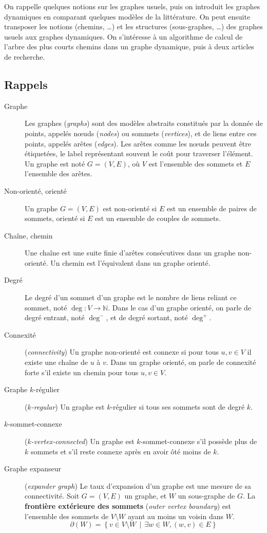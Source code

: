 \documentclass[12pt,a4paper]{article}
\begin{document}
On rappelle quelques notions sur les graphes usuels, puis on introduit
les graphes dynamiques en comparant quelques modèles de la
littérature. On peut ensuite transposer les notions (chemins, …) et
les structures (sous-graphes, …) des graphes usuels aux graphes
dynamiques. On s'intéresse à un algorithme de calcul de l'arbre des
plus courts chemins dans un graphe dynamique, puis à deux articles de
recherche.

\subsection{Rappels}

\begin{description}
\item[Graphe] Les graphes (\textit{graphs}) sont des modèles abstraits
  constitués par la donnée de points, appelés nœuds (\textit{nodes})
  ou sommets (\textit{vertices}), et de liens entre ces points,
  appelés arêtes (\textit{edges}). Les arêtes comme les nœuds peuvent
  être étiquetées, le label représentant souvent le coût pour
  traverser l'élément. Un graphe est noté \(G = (V, E)\), où \(V\)
  est l'ensemble des sommets et \(E\) l'ensemble des arêtes.
\item[Non-orienté, orienté] Un graphe \(G = (V, E)\) est non-orienté si
  \(E\) est un ensemble de paires de sommets, orienté si \(E\) est un
  ensemble de couples de sommets.
\item[Chaîne, chemin] Une chaîne est une suite finie d'arêtes
  consécutives dans un graphe non-orienté. Un chemin est l'équivalent
  dans un graphe orienté.
\item[Degré] Le degré d'un sommet d'un graphe est le nombre de liens
  reliant ce sommet, noté \(\deg : V \to \mathbb{N}\). Dans le cas
  d'un graphe orienté, on parle de degré entrant, noté \(\deg^-\), et
  de degré sortant, noté \(\deg^+\).
\item[Connexité] (\textit{connectivity}) Un graphe non-orienté est
  connexe si pour tous \(u, v \in V\) il existe une chaîne de \(u\) à
  \(v\). Dans un graphe orienté, on parle de connexité forte s'il
  existe un chemin pour tous \(u, v \in V\).
\item[Graphe \(k\)-régulier] (\textit{\(k\)-regular}) Un graphe est
  \(k\)-régulier si tous ses sommets sont de degré \(k\).
\item[\(k\)-sommet-connexe] (\textit{\(k\)-vertex-connected}) Un
  graphe est \(k\)-sommet-connexe s'il possède plus de \(k\) sommets
  et s'il reste connexe après en avoir ôté moins de \(k\).
\item[Graphe expanseur] (\textit{expander graph}) Le taux d'expansion
  d'un graphe est une mesure de sa connectivité. Soit \(G = (V, E)\)
  un graphe, et \(W\) un sous-graphe de \(G\). La \textbf{frontière
    extérieure des sommets} (\textit{outer vertex boundary}) est
  l'ensemble des sommets de \(V \setminus W\) ayant au moins un voisin
  dans \(W\).
  \[\partial(W) = \left\{v \in V \setminus W \,\middle|\, \exists w
      \in W, (w, v) \in E\right\}\]


\end{description}
\end{document}
